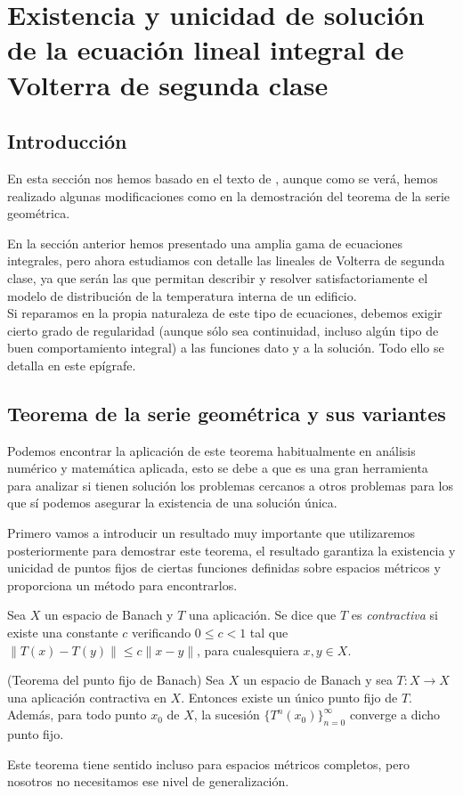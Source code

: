 \chapter{Existencia y unicidad de solución de la ecuación lineal integral de Volterra de segunda clase}
\section{Introducción}
En esta sección nos hemos basado en el texto de \cite{Atkinson}, aunque como se verá, hemos realizado algunas modificaciones como en la demostración del teorema de la serie geométrica.

En la sección anterior hemos presentado una amplia gama de ecuaciones integrales, pero ahora estudiamos con detalle las lineales de Volterra de segunda clase, ya que serán las que permitan describir y resolver satisfactoriamente el modelo de distribución de la temperatura interna de un edificio.\\ Si reparamos en la propia naturaleza de este tipo de ecuaciones, debemos exigir cierto grado de regularidad (aunque sólo sea continuidad, incluso algún tipo de buen comportamiento integral) a las funciones dato y a la solución. Todo ello se detalla en este epígrafe.
\section{Teorema de la serie geométrica y sus variantes}
Podemos encontrar la aplicación de este teorema habitualmente en análisis numérico y matemática aplicada, esto se debe a que es una gran herramienta para analizar si tienen solución los problemas cercanos a otros problemas para los que sí podemos asegurar la existencia de una solución única.

Primero vamos a introducir un resultado muy importante que utilizaremos posteriormente para demostrar este teorema, el resultado garantiza la existencia y unicidad de puntos fijos de ciertas funciones definidas sobre espacios métricos y proporciona un método para encontrarlos.
\begin{definicion}
	Sea $X$ un espacio de Banach y $T$ una aplicación. Se dice que $T$ es \textit{contractiva} si existe una constante $c$ verificando $0 \leqslant c < 1$ tal que $\lVert T(x) - T(y) \rVert \leqslant c \lVert x-y \rVert$, para cualesquiera $x, y \in X$.
\end{definicion}
\begin{teorema}
	(Teorema del punto fijo de Banach) Sea $X$ un espacio de Banach y sea $T:X \rightarrow X$ una aplicación contractiva en $X$. Entonces existe un único punto fijo de $T$.\\
	Además, para todo punto $x_0$ de $X$, la sucesión $\{T^n(x_{0})\}_{n=0}^\infty$ converge a dicho punto fijo.
\end{teorema}
Este teorema tiene sentido incluso para espacios métricos completos, pero nosotros no necesitamos ese nivel de generalización. 

